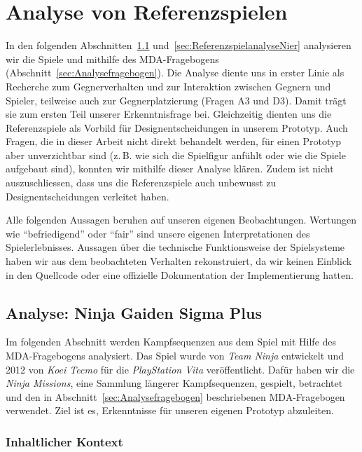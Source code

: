 \documentclass[../Main.tex]{subfiles}
\begin{document}
\section{Analyse von Referenzspielen} \label{sec:Referenzspielanalyse}

In den folgenden Abschnitten~\ref{sec:ReferenzspielanalyseNinja} und~\ref{sec:ReferenzspielanalyseNier} analysieren wir die Spiele  und  mithilfe des MDA-Fragebogens (Abschnitt~\ref{sec:Analysefragebogen}). Die Analyse diente uns in erster Linie als Recherche zum Gegnerverhalten und zur Interaktion zwischen Gegnern und Spieler, teilweise auch zur Gegnerplatzierung (Fragen A3 und D3). Damit trägt sie zum ersten Teil unserer Erkenntnisfrage bei. Gleichzeitig dienten uns die Referenzspiele als Vorbild für Designentscheidungen in unserem Prototyp. Auch Fragen, die in dieser Arbeit nicht direkt behandelt werden, für einen Prototyp aber unverzichtbar sind (z.\,B. wie sich die Spielfigur anfühlt oder wie die Spiele aufgebaut sind), konnten wir mithilfe dieser Analyse klären. Zudem ist nicht auszuschliessen, dass uns die Referenzspiele auch unbewusst zu Designentscheidungen verleitet haben.

Alle folgenden Aussagen beruhen auf unseren eigenen Beobachtungen. Wertungen wie \enquote{befriedigend} oder \enquote{fair} sind unsere eigenen Interpretationen des Spielerlebnisses. Aussagen über die technische Funktionsweise der Spielsysteme haben wir aus dem beobachteten Verhalten rekonstruiert, da wir keinen Einblick in den Quellcode oder eine offizielle Dokumentation der Implementierung hatten.

\subsection{Analyse: Ninja Gaiden Sigma Plus} \label{sec:ReferenzspielanalyseNinja}

Im folgenden Abschnitt werden Kampfsequenzen aus dem Spiel  mit Hilfe des MDA-Fragebogens analysiert. Das Spiel wurde von \textit{Team Ninja} entwickelt und 2012 von \textit{Koei Tecmo} für die \textit{PlayStation Vita} veröffentlicht.\autocite{koeitechmo_ninjagaiden_2012} Dafür haben wir die \textit{Ninja Missions}, eine Sammlung längerer Kampfsequenzen, gespielt, betrachtet und den in Abschnitt~\ref{sec:Analysefragebogen} beschriebenen MDA-Fragebogen verwendet. Ziel ist es, Erkenntnisse für unseren eigenen Prototyp abzuleiten.

\subsubsection{Inhaltlicher Kontext}
\end{document}
